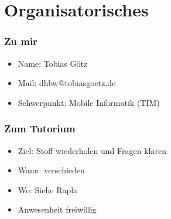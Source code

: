 \section{Organisatorisches}
\begin{frame}
    \frametitle{Zu mir}
    \begin{itemize}
        \item Name: Tobias Götz
        \item Mail: dhbw@tobiasgoetz.de
        \item Schwerpunkt: Mobile Informatik (TIM)
    \end{itemize}
\end{frame}

\begin{frame}
    \frametitle{Zum Tutorium}
    \begin{itemize}
        \item Ziel: Stoff wiederholen und Fragen klären
        \item Wann: verschieden
        \item Wo: Siehe Rapla
        \item Anwesenheit freiwillig
    \end{itemize}
\end{frame}